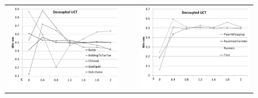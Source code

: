 \documentclass[conference]{IEEEtran}
\begin{document}
\begin{figure}[t!]
\centering
\begin{tabular}{ccc}
\includegraphics[scale=0.33]{figures/duct1} & ~ & \includegraphics[scale=0.33]{figures/duct2}\\

\end{tabular}
\end{figure}
\end{document}
